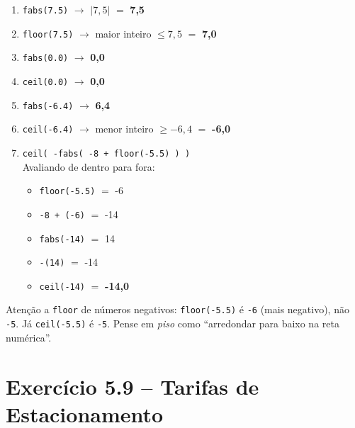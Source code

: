\documentclass[12pt,a4paper]{article}
\begin{document}
\begin{respostabox}
\begin{enumerate}[label=\textbf{\alph*)}]
\item \texttt{fabs(7.5)} $\to$ $|7{,}5|$ $=$ \textbf{7,5}
\item \texttt{floor(7.5)} $\to$ maior inteiro $\leq 7{,}5$ $=$ \textbf{7,0}
\item \texttt{fabs(0.0)} $\to$ \textbf{0,0}
\item \texttt{ceil(0.0)} $\to$ \textbf{0,0}
\item \texttt{fabs(-6.4)} $\to$ \textbf{6,4}
\item \texttt{ceil(-6.4)} $\to$ menor inteiro $\geq -6{,}4$ $=$ \textbf{-6,0}
\item \texttt{ceil( -fabs( -8 + floor(-5.5) ) )}\\
  Avaliando de dentro para fora:
  \begin{itemize}[noitemsep]
    \item \texttt{floor(-5.5)} $=$ -6
    \item \texttt{-8 + (-6)} $=$ -14
    \item \texttt{fabs(-14)} $=$ 14
    \item \texttt{-(14)} $=$ -14
    \item \texttt{ceil(-14)} $=$ \textbf{-14,0}
  \end{itemize}
\end{enumerate}

\begin{boaprática}
  Atenção a \texttt{floor} de números negativos: \texttt{floor(-5.5)} é \texttt{-6}
  (mais negativo), não \texttt{-5}. Já \texttt{ceil(-5.5)} é \texttt{-5}.
  Pense em \textit{piso} como ``arredondar para baixo na reta numérica''.
\end{boaprática}
\end{respostabox}

\section{Exercício 5.9 -- Tarifas de Estacionamento}
\end{document}
